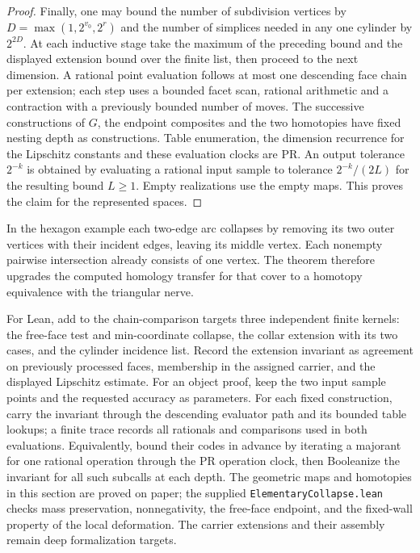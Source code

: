 \begin{proof}
Finally, one may bound the number of subdivision vertices by
$D=\max(1,2^{v_0},2^r)$ and the number of simplices needed in any
one cylinder by $2^{2D}$. At each inductive stage take the maximum
of the preceding bound and the displayed extension bound over the
finite list, then proceed to the next dimension. A rational point
evaluation follows at most one descending face chain per extension;
each step uses a bounded facet scan, rational arithmetic and a
contraction with a previously bounded number of moves. The successive
constructions of $G$, the endpoint composites and the two homotopies
have fixed nesting depth as constructions. Table enumeration, the
dimension recurrence for the Lipschitz constants and these evaluation
clocks are PR. An output tolerance $2^{-k}$ is obtained by evaluating
a rational input sample to tolerance $2^{-k}/(2L)$ for the resulting
bound $L\ge1$. Empty realizations use the empty maps. This proves
the claim for the represented spaces.
\end{proof}

In the hexagon example each two-edge arc collapses by removing its
two outer vertices with their incident edges, leaving its middle vertex.
Each nonempty pairwise intersection already consists of one vertex.
The theorem therefore upgrades the computed homology transfer for that
cover to a homotopy equivalence with the triangular nerve.

For Lean, add to the chain-comparison targets three independent
finite kernels: the free-face test and min-coordinate collapse, the
collar extension with its two cases, and the cylinder incidence list.
Record the extension invariant as agreement on previously processed
faces, membership in the assigned carrier, and the displayed Lipschitz
estimate. For an object proof, keep the two input sample points and the
requested accuracy as parameters. For each fixed construction, carry the
invariant through the descending evaluator path and its bounded table
lookups; a finite trace records all rationals and comparisons used in
both evaluations. Equivalently, bound their codes in advance by iterating
a majorant for one rational operation through the PR operation clock,
then Booleanize the invariant for all such subcalls at each depth.
The geometric maps and homotopies in this section are proved on paper;
the supplied \texttt{ElementaryCollapse.lean} checks mass preservation, nonnegativity, the free-face endpoint, and the fixed-wall property of the local deformation. The carrier extensions and their assembly remain deep formalization targets.
